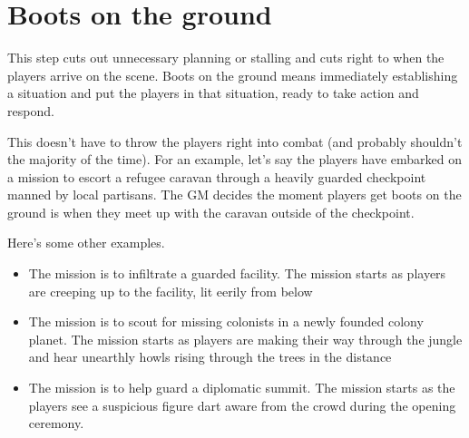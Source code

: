 \section{Boots on the ground}

This step cuts out unnecessary planning or stalling and cuts right to when the players arrive on the scene. Boots on the ground means immediately establishing a situation and put the players in that situation, ready to take action and respond. 

This doesn’t have to throw the players right into combat (and probably shouldn’t the majority of the time). For an example, let’s say the players have embarked on a mission to escort a refugee caravan through a heavily guarded checkpoint manned by local partisans. The GM decides the moment players get boots on the ground is when they meet up with the caravan outside of the checkpoint. 

Here’s some other examples.
\begin{itemize}
\item The mission is to infiltrate a guarded facility. The mission starts as players are creeping up to the facility, lit eerily from below
\item The mission is to scout for missing colonists in a newly founded colony planet. The mission starts as players are making their way through the jungle and hear unearthly howls rising through the trees in the distance
\item The mission is to help guard a diplomatic summit. The mission starts as the players see a suspicious figure dart aware from the crowd during the opening ceremony.
\end{itemize}  